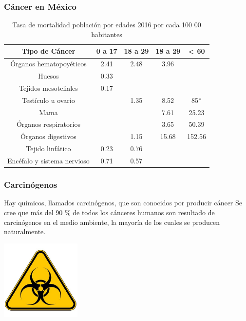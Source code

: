 \documentclass{beamer}
\begin{document}
\begin{frame}
	\frametitle{Cáncer en México}
	\begin{table}[h!]	
		\centering
		\begin{tabular}{||c|c|c|c|c||}
			\hline
			\textbf{Tipo de Cáncer }      & \textbf{0 a 17} & \textbf{18 a 29} & \textbf{18 a 29} & \textbf{< 60} \\ \hline\hline
			Órganos hematopoyéticos                & 2.41 & 2.48 & 3.96 &   \\ 
			Huesos                                 & 0.33 &      &      &     \\ 
			Tejidos mesoteliales                   & 0.17 &      &      &     \\ 
			Testículo u ovario                     &      & 1.35 & 8.52 & 85*    \\ 
			Mama                                   &      &      & 7.61 & 25.23 \\ 
			Órganos respiratorios                  &      &      & 3.65 & 50.39 \\ 
			Órganos digestivos                     &      & 1.15 & 15.68& 152.56     \\ 
			Tejido linfático                       & 0.23 & 0.76 &      & \\ 
			Encéfalo y sistema nervioso            & 0.71 & 0.57 &      &  \\ \hline 
		\end{tabular}
		\caption{Tasa de mortalidad población por edades 2016 por cada 100 00 habitantes}
	\end{table}
	
\end{frame}


\begin{frame}
	
	\frametitle{Carcinógenos}
	
   Hay químicos, llamados carcinógenos, que son conocidos por producir cáncer Se cree que más del 90 $\%$ de todos los cánceres humanos son resultado de carcinógenos en el medio ambiente, la mayoría de los cuales se producen naturalmente.\\
   
   \begin{center}
   	\centering
   	\includegraphics[width=0.3\textwidth]{peligroBiologico}
   \end{center}
   
\end{frame}
   
\end{document}
